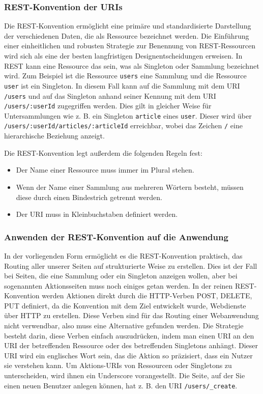\subsubsection{REST-Konvention der URIs}

Die REST-Konvention ermöglicht eine primäre und standardisierte Darstellung der verschiedenen Daten, die als Ressource bezeichnet werden.
Die Einführung einer einheitlichen und robusten Strategie zur Benennung von REST-Ressourcen wird sich als eine der besten langfristigen Designentscheidungen erweisen.
In REST kann eine Ressource das sein, was als Singleton oder Sammlung bezeichnet wird.
Zum Beispiel ist die Ressource \lstinline{users} eine Sammlung und die Ressource \lstinline{user} ist ein Singleton.
In diesem Fall kann auf die Sammlung mit dem \ac{URI} \lstinline{/users} und auf das Singleton anhand seiner Kennung mit dem \ac{URI} \lstinline{/users/:userId} zugegriffen werden.
Dies gilt in gleicher Weise für Untersammlungen wie z. B. ein Singleton \lstinline{article} eines \lstinline{user}.
Dieser wird über \lstinline{/users/:userId/articles/:articleId} erreichbar, wobei das Zeichen \lstinline{/} eine hierarchische Beziehung anzeigt.

Die REST-Konvention legt außerdem die folgenden Regeln fest:

\begin{itemize}
  \item Der Name einer Ressource muss immer im Plural stehen.
  \item Wenn der Name einer Sammlung aus mehreren Wörtern besteht, müssen diese durch einen Bindestrich getrennt werden.
  \item Der \ac{URI} muss in Kleinbuchstaben definiert werden.
\end{itemize}

\subsubsection{Anwenden der REST-Konvention auf die Anwendung}

In der vorliegenden Form ermöglicht es die REST-Konvention praktisch, das Routing aller unserer Seiten auf strukturierte Weise zu erstellen.
Dies ist der Fall bei Seiten, die eine Sammlung oder ein Singleton anzeigen wollen, aber bei sogenannten Aktionsseiten muss noch einiges getan werden.
In der reinen REST-Konvention werden Aktionen direkt durch die \ac{HTTP}-Verben POST, DELETE, PUT definiert, da die Konvention mit dem Ziel entwickelt wurde, Webdienste über \ac{HTTP} zu erstellen.
Diese Verben sind für das Routing einer Webanwendung nicht verwendbar, also muss eine Alternative gefunden werden.
Die Strategie besteht darin, diese Verben einfach auszudrücken, indem man einen URI an den URI der betreffenden Ressource oder des betreffenden Singletons anhängt.
Dieser \ac{URI} wird ein englisches Wort sein, das die Aktion so präzisiert, dass ein Nutzer sie verstehen kann.
Um Aktions-\ac{URI}s von Ressourcen oder Singletons zu unterscheiden, wird ihnen ein Underscore vorangestellt.
Die Seite, auf der Sie einen neuen Benutzer anlegen können, hat z. B. den \ac{URI} \lstinline{/users/_create}.

